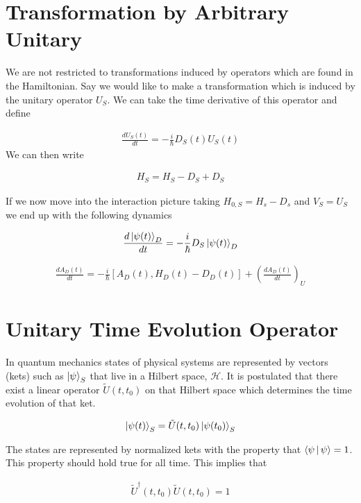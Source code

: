 \documentclass[12pt]{article}
\begin{document}
\section{Transformation by Arbitrary Unitary}

We are not restricted to transformations induced by operators which are found in the Hamiltonian. Say we would like to make a transformation which is induced by the unitary operator $U_S$. We can take the time derivative of this operator and define

\begin{align}
\frac{d U_S(t)}{d t} = -\frac{i}{\hbar} D_S(t) U_S(t)
\end{align} We can then write

\begin{align}
H_S = H_S - D_S + D_S
\end{align}

If we now move into the interaction picture taking $H_{0,S} = H_s - D_s$ and $V_S = U_S$ we end up with the following dynamics

\begin{align}
\frac{d \ket{\psi(t)}_D}{d t} = -\frac{i}{\hbar}D_S\ket{\psi(t)}_D
\end{align}

\begin{align}
\boxed{\frac{d A_D(t)}{d t} = -\frac{i}{\hbar} \left[A_D(t), H_D(t)-D_D(t)\right] + \left(\frac{d A_D(t)}{d t} \right)_U}
\end{align}


\section{Unitary Time Evolution Operator}

In quantum mechanics states of physical systems are represented by vectors (kets) such as $\ket{\psi}_S$ that live in a Hilbert space, $\mathcal{H}$. It is postulated that there exist a linear operator $\tilde{U}(t,t_0)$ on that Hilbert space which determines the time evolution of that ket.

\begin{align}
\ket{\psi(t)}_S = \tilde{U}(t,t_0) \ket{\psi(t_0)}_S
\end{align}

The states are represented by normalized kets with the property that $\Braket{\psi | \psi} = 1$. This property should hold true for all time. This implies that 

\begin{align}
\tilde{U}^{\dag}(t,t_0)\tilde{U}(t,t_0) = 1
\end{align}
\end{document}
